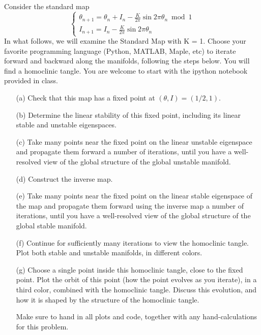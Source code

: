 \documentclass[12pt]{report}
\begin{document}
\begin{problem}
    Consider the standard map
\begin{equation}
    \left\{\begin{array}{l}
\theta_{n+1}=\theta_{n}+I_{n}-\frac{K}{2 \pi} \sin 2 \pi \theta_{n} \bmod 1 \\
I_{n+1}=I_{n}-\frac{K}{2 \pi} \sin 2 \pi \theta_{n}
\end{array}\right.
\end{equation}
In what follows, we will examine the Standard Map with K = 1. Choose your
favorite programming language (Python, MATLAB, Maple, etc) to iterate forward
and backward along the manifolds, following the steps below. You will find a homoclinic tangle. You are welcome to start with the ipython notebook provided in class.\\

\begin{enumerate}
    \item [(a)]  Check that this map has a fixed point at $(\theta, I) = (1/2, 1)$. \\

    \item [(b)] Determine the linear stability of this fixed point, including its linear stable
and unstable eigenspaces.\\

    \item [(c)] Take many points near the fixed point on the linear unstable eigenspace and
propagate them forward a number of iterations, until you have a well-resolved
view of the global structure of the global unstable manifold. \\

    \item[(d)] Construct the inverse map.\\

    \item[(e)] Take many points near the fixed point on the linear stable eigenspace of the
map and propagate them forward using the inverse map a number of iterations,
until you have a well-resolved view of the global structure of the global stable
manifold.\\ 

    \item[(f)] Continue for sufficiently many iterations to view the homoclinic tangle.
Plot both
stable and unstable manifolds, in different colors.\\

    \item[(g)] Choose a single point inside this homoclinic tangle, close to the fixed point.
Plot the orbit of this point (how the point evolves as you iterate), in a third
color, combined with the homoclinic tangle. Discuss this evolution, and how it is shaped by the structure of the homoclinic tangle.  

Make sure to hand in all plots and code, together with any hand-calculations for this problem.
\end{enumerate}



\end{problem}
\end{document}

